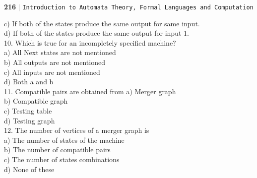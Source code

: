 \documentclass{article}
\begin{document}
\newpage
\begin{flushleft}
    \textbf{216}\hspace*{0.1cm} \textbf{$|$} \hspace*{0.1cm} \texttt{Introduction to Automata Theory, Formal Languages and Computation}
  \end{flushleft}

  \vspace*{0.5cm}
\begin{multicols}{2}
\hspace*{0.4cm} c) If both of the states produce the same
output for same input.\\
\hspace*{0.4cm} d) If both of the states produce the same
output for input 1.\\

\vspace*{0.3cm}
10. Which is true for an incompletely specified
machine?\\
\hspace*{0.4cm} a) All Next states are not mentioned\\
\hspace*{0.4cm} b) All outputs are not mentioned\\
\hspace*{0.4cm} c) All inputs are not mentioned\\
\hspace*{0.4cm} d) Both a and b\\

\vspace*{0.3cm}
11. Compatible pairs are obtained from
\hspace*{0.4cm} a) Merger graph\\
\hspace*{0.4cm} b) Compatible graph\\
\hspace*{0.4cm} c) Testing table\\
\hspace*{0.4cm} d) Testing graph\\

\vspace*{0.3cm}
12. The number of vertices of a merger graph is\\
\hspace*{0.4cm} a) The number of states of the machine\\
\hspace*{0.4cm} b) The number of compatible pairs\\
\hspace*{0.4cm} c) The number of states combinations\\
\hspace*{0.4cm} d) None of these\\


\end{multicols}
\end{document}
